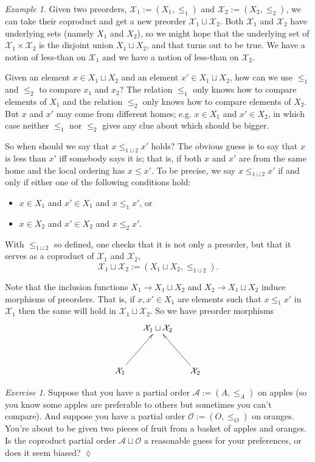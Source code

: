 \documentclass{book}
\def\mc{\mathcal}
\def\to{\rightarrow}
\def\mcA{\mc{A}}
\def\mcO{\mc{O}}
\def\mcX{\mc{X}}
\theoremstyle{remark}
\newtheorem{example}[subsubsection]{Example}
\newtheorem{exc}[subsubsection]{Exercise}
\newenvironment{exercise}{\begin{exc}}{\hspace*{\fill}$\lozenge$\end{exc}}
\theoremstyle{definition}
\begin{document}
\begin{example}

Given two preorders, $\mcX_1:=(X_1,\leq_1)$ and $\mcX_2:=(X_2,\leq_2)$, we can take their coproduct and get a new preorder $\mcX_1\sqcup\mcX_2$. Both $\mcX_1$ and $\mcX_2$ have underlying sets (namely $X_1$ and $X_2$), so we might hope that the underlying set of $\mcX_1\times\mcX_2$ is the disjoint union $X_1\sqcup X_2$, and that turns out to be true. We have a notion of less-than on $\mcX_1$ and we have a notion of less-than on $\mcX_2$. 

Given an element $x\in X_1\sqcup X_2$ and an element $x'\in X_1\sqcup X_2$, how can we use $\leq_1$ and $\leq_2$ to compare $x_1$ and $x_2$? The relation $\leq_1$ only knows how to compare elements of $X_1$ and the relation $\leq_2$ only knows how to compare elements of $X_2$. But $x$ and $x'$ may come from different homes; e.g. $x\in X_1$ and $x'\in X_2$, in which case neither $\leq_1$ nor $\leq_2$ gives any clue about which should be bigger. 

So when should we say that $x\leq_{1\sqcup 2} x'$ holds? The obvious guess is to say that $x$ is less than $x'$ iff somebody says it is; that is, if both $x$ and $x'$ are from the same home and the local ordering has $x\leq x'$. To be precise, we say $x\leq_{1\sqcup 2}x'$ if and only if either one of the following conditions hold:
\begin{itemize}
\item $x\in X_1$ and $x'\in X_1$ and $x\leq_1x'$, or
\item $x\in X_2$ and $x'\in X_2$ and $x\leq_2x'$.
\end{itemize}
With $\leq_{1\sqcup 2}$ so defined, one checks that it is not only a preorder, but that it serves as a coproduct of $\mcX_1$ and $\mcX_2$, 
$$\mcX_1\sqcup\mcX_2:=(X_1\sqcup X_2,\leq_{1\sqcup 2}).$$

Note that the inclusion functions $X_1\to X_1\sqcup X_2$ and $X_2\to X_1\sqcup X_2$ induce morphisms of preorders. That is, if $x,x'\in X_1$ are elements such that $x\leq_1x'$ in $\mcX_1$ then the same will hold in $\mcX_1\sqcup\mcX_2$. So we have preorder morphisms
$$\xymatrix@=15pt{&\mcX_1\sqcup\mcX_2\\\\\mcX_1\ar[ruu]&&\mcX_2\ar[luu]}$$

\end{example}

\begin{exercise}
Suppose that you have a partial order $\mcA:=(A,\leq_A)$ on apples (so you know some apples are preferable to others but sometimes you can't compare). And suppose you have a partial order $\mcO:=(O,\leq_O)$ on oranges. You're about to be given two pieces of fruit from a basket of apples and oranges. Is the coproduct partial order $\mcA\sqcup\mcO$ a reasonable guess for your preferences, or does it seem biased?
\end{exercise}
\end{document}
